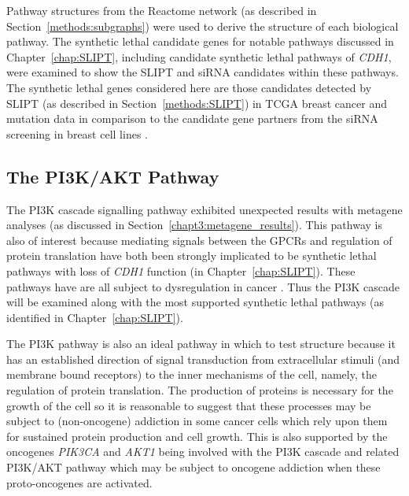 Pathway structures from the Reactome network (as described in Section~\ref{methods:subgraphs}) were used to derive the  structure of each biological pathway. The \gls{synthetic lethal} candidate genes for notable pathways discussed in Chapter~\ref{chap:SLIPT}, including candidate \gls{synthetic lethal} pathways of \textit{CDH1}, were examined to show the \gls{SLIPT} and \gls{siRNA} candidates within these pathways. The \gls{synthetic lethal} genes considered here are those candidates detected by \gls{SLIPT} (as described in Section~\ref{methods:SLIPT}) in \gls{TCGA} breast cancer  and \gls{mutation} data \citep{TCGA2012} in comparison to the candidate gene partners from the \gls{siRNA} screening in breast cell lines \citep{Telford2015}. 

\FloatBarrier

\subsection{The PI3K/AKT Pathway}  \label{chapt4:SL_Genes_PI3K}

\FloatBarrier

The \acrfull{PI3K} cascade signalling pathway exhibited unexpected results with \gls{metagene} analyses (as discussed in Section~\ref{chapt3:metagene_results}). This pathway is also of interest because mediating signals between the \glspl{GPCR} and regulation of protein translation have both been strongly implicated to be \gls{synthetic lethal} pathways with loss of \textit{CDH1} function (in Chapter~\ref{chap:SLIPT}). These pathways have are all subject to dysregulation in cancer \citep{Dorsam2007, Courtney2010, Gao2015}. Thus the PI3K cascade will be examined along with the most supported \gls{synthetic lethal} pathways (as identified in Chapter~\ref{chap:SLIPT}).

The \gls{PI3K} pathway is also an ideal pathway in which to test  structure because it has an established direction of signal transduction from extracellular stimuli (and membrane bound receptors) to the inner mechanisms of the cell, namely, the regulation of protein translation. The production of proteins is necessary for the growth of the cell so it is reasonable to suggest that these processes may be subject to (non-\gls{oncogene}) addiction in some cancer cells which rely upon them for sustained protein production and cell growth. This is also supported by the \glspl{oncogene} \textit{PIK3CA} and \textit{AKT1} being involved with the PI3K cascade and related PI3K/AKT pathway which may be subject to \gls{oncogene addiction} when these proto-oncogenes are activated.

